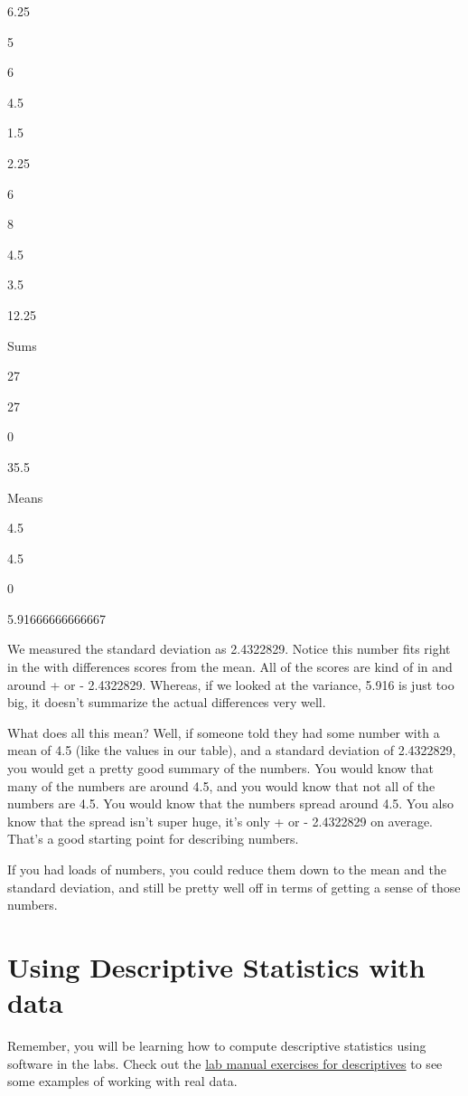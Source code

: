 \documentclass[
]{book}
\begin{document}
6.25

5

6

4.5

1.5

2.25

6

8

4.5

3.5

12.25

Sums

27

27

0

35.5

Means

4.5

4.5

0

5.91666666666667

We measured the standard deviation as 2.4322829. Notice this number fits right in the with differences scores from the mean. All of the scores are kind of in and around + or - 2.4322829. Whereas, if we looked at the variance, 5.916 is just too big, it doesn't summarize the actual differences very well.

What does all this mean? Well, if someone told they had some number with a mean of 4.5 (like the values in our table), and a standard deviation of 2.4322829, you would get a pretty good summary of the numbers. You would know that many of the numbers are around 4.5, and you would know that not all of the numbers are 4.5. You would know that the numbers spread around 4.5. You also know that the spread isn't super huge, it's only + or - 2.4322829 on average. That's a good starting point for describing numbers.

If you had loads of numbers, you could reduce them down to the mean and the standard deviation, and still be pretty well off in terms of getting a sense of those numbers.

\hypertarget{using-descriptive-statistics-with-data}{%
\section{Using Descriptive Statistics with data}\label{using-descriptive-statistics-with-data}}

Remember, you will be learning how to compute descriptive statistics using software in the labs. Check out the \href{https://crumplab.github.io/statisticsLab/lab-2-descriptive-statistics.html}{lab manual exercises for descriptives} to see some examples of working with real data.
\end{document}
